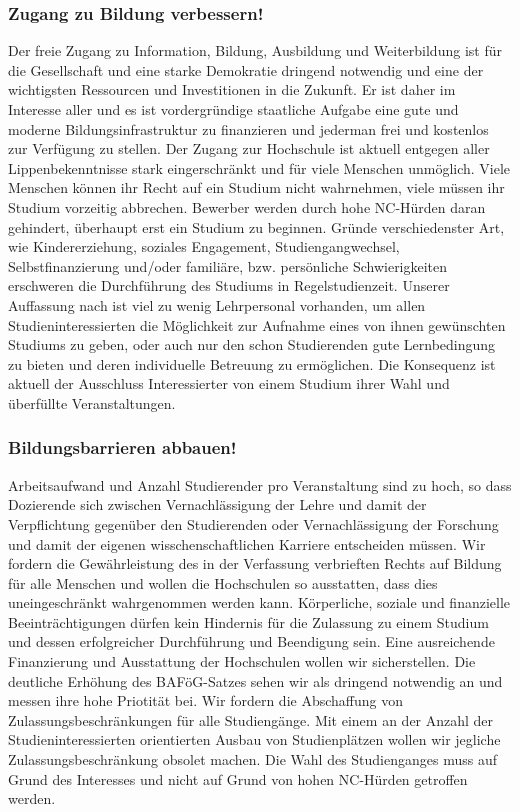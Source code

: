 \subsubsection{Zugang zu Bildung verbessern!}
\abstimmung
Der freie Zugang zu Information, Bildung, Ausbildung und Weiterbildung ist für die Gesellschaft und eine starke Demokratie dringend notwendig und eine der wichtigsten Ressourcen und Investitionen in die Zukunft. Er ist daher im Interesse aller und es ist vordergründige staatliche Aufgabe eine gute und moderne Bildungsinfrastruktur zu finanzieren und jederman frei und kostenlos zur Verfügung zu stellen. Der Zugang zur Hochschule ist aktuell entgegen aller Lippenbekenntnisse stark eingerschränkt und für viele Menschen unmöglich. Viele Menschen können ihr Recht auf ein Studium nicht wahrnehmen, viele müssen ihr Studium vorzeitig abbrechen. Bewerber werden durch hohe NC-Hürden daran gehindert, überhaupt erst ein Studium zu beginnen. Gründe verschiedenster Art, wie Kindererziehung, soziales Engagement, Studiengangwechsel, Selbstfinanzierung und/oder familiäre, bzw. persönliche Schwierigkeiten erschweren die Durchführung des Studiums in Regelstudienzeit. Unserer Auffassung nach ist viel zu wenig Lehrpersonal vorhanden, um allen Studieninteressierten die Möglichkeit zur Aufnahme eines von ihnen gewünschten Studiums zu geben, oder auch nur den schon Studierenden gute Lernbedingung zu bieten und deren individuelle Betreuung zu ermöglichen. Die Konsequenz ist aktuell der Ausschluss Interessierter von einem Studium ihrer Wahl und überfüllte Veranstaltungen.

\subsubsection{Bildungsbarrieren abbauen!}
\abstimmung
Arbeitsaufwand und Anzahl Studierender pro Veranstaltung sind zu hoch, so dass Dozierende sich zwischen Vernachlässigung der Lehre und damit der Verpflichtung gegenüber den Studierenden oder Vernachlässigung der Forschung und damit der eigenen wisschenschaftlichen Karriere entscheiden müssen. Wir fordern die Gewährleistung des in der Verfassung verbrieften Rechts auf Bildung für alle Menschen und wollen die Hochschulen so ausstatten, dass dies uneingeschränkt wahrgenommen werden kann. Körperliche, soziale und finanzielle Beeinträchtigungen dürfen kein Hindernis für die Zulassung zu einem Studium und dessen erfolgreicher Durchführung und Beendigung sein. Eine ausreichende Finanzierung und Ausstattung der Hochschulen wollen wir sicherstellen. Die deutliche Erhöhung des BAFöG-Satzes sehen wir als dringend notwendig an und messen ihre hohe Priotität bei. Wir fordern die Abschaffung von Zulassungsbeschränkungen für alle Studiengänge. Mit einem an der Anzahl der Studieninteressierten orientierten Ausbau von Studienplätzen wollen wir jegliche Zulassungsbeschränkung obsolet machen. Die Wahl des Studienganges muss auf Grund des Interesses und nicht auf Grund von hohen NC-Hürden getroffen werden.
 

